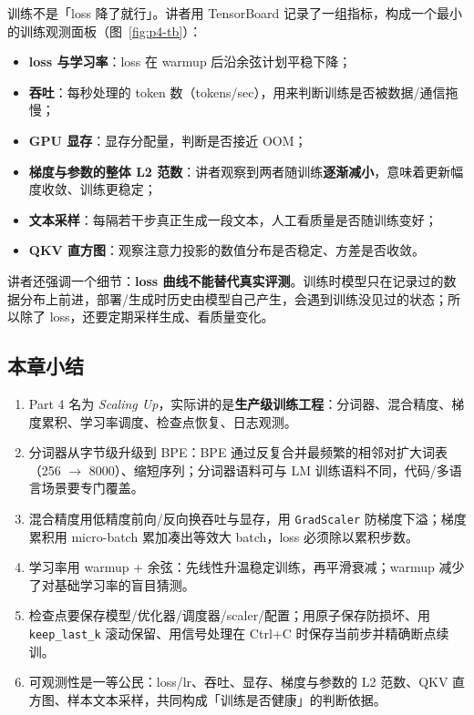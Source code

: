 训练不是「loss 降了就行」。讲者用 TensorBoard 记录了一组指标，构成一个最小的训练观测面板（图~\ref{fig:p4-tb}）：

\begin{itemize}
\item \textbf{loss 与学习率}：loss 在 warmup 后沿余弦计划平稳下降；
\item \textbf{吞吐}：每秒处理的 token 数（tokens/sec），用来判断训练是否被数据/通信拖慢；
\item \textbf{GPU 显存}：显存分配量，判断是否接近 OOM；
\item \textbf{梯度与参数的整体 L2 范数}：讲者观察到两者随训练\textbf{逐渐减小}，意味着更新幅度收敛、训练更稳定；
\item \textbf{文本采样}：每隔若干步真正生成一段文本，人工看质量是否随训练变好；
\item \textbf{QKV 直方图}：观察注意力投影的数值分布是否稳定、方差是否收敛。
\end{itemize}

讲者还强调一个细节：\textbf{loss 曲线不能替代真实评测}。训练时模型只在记录过的数据分布上前进，部署/生成时历史由模型自己产生，会遇到训练没见过的状态；所以除了 loss，还要定期采样生成、看质量变化。

\subsection{本章小结}
\begin{enumerate}
\item Part 4 名为 \emph{Scaling Up}，实际讲的是\textbf{生产级训练工程}：分词器、混合精度、梯度累积、学习率调度、检查点恢复、日志观测。
\item 分词器从字节级升级到 BPE：BPE 通过反复合并最频繁的相邻对扩大词表（256 $\rightarrow$ 8000）、缩短序列；分词器语料可与 LM 训练语料不同，代码/多语言场景要专门覆盖。
\item 混合精度用低精度前向/反向换吞吐与显存，用 \texttt{GradScaler} 防梯度下溢；梯度累积用 micro-batch 累加凑出等效大 batch，loss 必须除以累积步数。
\item 学习率用 warmup + 余弦：先线性升温稳定训练，再平滑衰减；warmup 减少了对基础学习率的盲目猜测。
\item 检查点要保存模型/优化器/调度器/scaler/配置；用原子保存防损坏、用 \texttt{keep\_last\_k} 滚动保留、用信号处理在 Ctrl+C 时保存当前步并精确断点续训。
\item 可观测性是一等公民：loss/lr、吞吐、显存、梯度与参数的 L2 范数、QKV 直方图、样本文本采样，共同构成「训练是否健康」的判断依据。
\end{enumerate}

